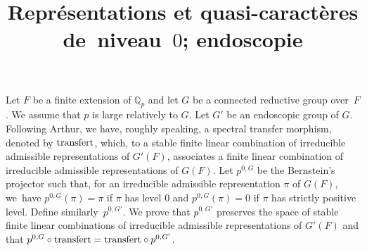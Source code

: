 \documentclass[JEP,XML,SOM,Unicode,francais]{cedram}
\theoremstyle{plain}
\theoremstyle{definition}
\begin{document}
\frontmatter
\title{Représentations et quasi-caractères de~niveau~$0$; endoscopie}

\author[\initial{J.-L.} \lastname{Waldspurger}]{ }
\address{CNRS, Institut de Mathématiques de Jussieu-Paris rive gauche\\
4 place Jussieu, Boîte courrier 247, 75252 Paris Cedex 05, France}

\begin{altabstract}
Let $F$ be a finite extension of $\mathbb{Q}_{p}$ and let $G$ be a connected reductive group over~$F$. We assume that $p$ is large relatively to $G$. Let $G'$ be an endoscopic group of $G$. Following Arthur, we have, roughly speaking, a spectral transfer morphism, denoted by $\textup{transfert}$, which, to a stable finite linear combination of irreducible admissible representations of $G'(F)$, associates a finite linear combination of irreducible admissible representations of $G(F)$. Let $p^{0,G}$ be the Bernstein's projector such that, for an irreducible admissible representation $\pi$ of $G(F)$, we~have $p^{0,G}(\pi)=\pi$ if $\pi$ has level $0$ and $p^{0,G}(\pi)=0$ if $\pi$ has strictly positive level. Define similarly~$p^{0,G'}$. We prove that $p^{0,G'}$ preserves the space of stable finite linear combinations of irreducible admissible representations of $G'(F)$ and that $p^{0,G}\circ \textup{transfert}=\textup{transfert}\circ p^{0,G'}$.
\end{altabstract}




\end{document}

